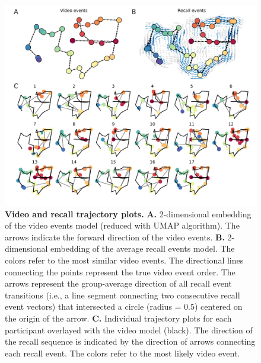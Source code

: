 \documentclass{article}
\begin{document}
\begin{figure}[tp]
\centering
\includegraphics[width=1\textwidth]{figs/3_trajectory.pdf}
\caption{\small \textbf{Video and recall trajectory plots.} \textbf{A.} 2-dimensional embedding of the video events model (reduced with UMAP algorithm). The arrows indicate the forward direction of the video events. \textbf{B.} 2-dimensional embedding of the average recall events model.  The colors refer to the most similar video events. The directional lines connecting the points represent the true video event order. The arrows represent the group-average direction of all recall event transitions (i.e., a line segment connecting two consecutive recall event vectors) that intersected a circle (radius = 0.5) centered on the origin of the arrow. \textbf{C.} Individual trajectory plots for each participant overlayed with the video model (black). The direction of the recall sequence is indicated by the direction of arrows connecting each recall event.  The colors refer to the most likely video event.}
\label{fig:trajectory}
\end{figure}
\end{document}
